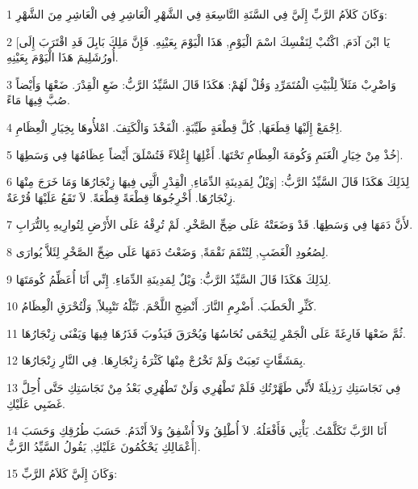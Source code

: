 \par 1 وَكَانَ كَلاَمُ الرَّبِّ إِلَيَّ فِي السَّنَةِ التَّاسِعَةِ فِي الشَّهْرِ الْعَاشِرِ فِي الْعَاشِرِ مِنَ الشَّهْرِ:
\par 2 [يَا ابْنَ آدَمَ, اكْتُبْ لِنَفْسِكَ اسْمَ الْيَوْمِ, هَذَا الْيَوْمَ بِعَيْنِهِ. فَإِنَّ مَلِكَ بَابِلَ قَدِ اقْتَرَبَ إِلَى أُورُشَلِيمَ هَذَا الْيَوْمَ بِعَيْنِهِ.
\par 3 وَاضْرِبْ مَثَلاً لِلْبَيْتِ الْمُتَمَرِّدِ وَقُلْ لَهُمْ: هَكَذَا قَالَ السَّيِّدُ الرَّبُّ: ضَعِ الْقِدْرَ. ضَعْهَا وَأَيْضاً صُبَّ فِيهَا مَاءً.
\par 4 اِجْمَعْ إِلَيْهَا قِطَعَهَا, كُلَّ قِطْعَةٍ طَيِّبَةٍ. الْفَخْذَ وَالْكَتِفَ. امْلأُوهَا بِخِيَارِ الْعِظَامِ.
\par 5 خُذْ مِنْ خِيَارِ الْغَنَمِ وَكُومَةَ الْعِظَامِ تَحْتَهَا. أَغْلِهَا إِغْلاَءً فَتُسْلَقَ أَيْضاً عِظَامُهَا فِي وَسَطِهَا].
\par 6 لِذَلِكَ هَكَذَا قَالَ السَّيِّدُ الرَّبُّ: [وَيْلٌ لِمَدِينَةِ الدِّمَاءِ, الْقِدْرِ الَّتِي فِيهَا زِنْجَارُهَا وَمَا خَرَجَ مِنْهَا زِنْجَارُهَا. أَخْرِجُوهَا قِطْعَةً قِطْعَةً. لاَ تَقَعُ عَلَيْهَا قُرْعَةٌ.
\par 7 لأَنَّ دَمَهَا فِي وَسَطِهَا. قَدْ وَضَعَتْهُ عَلَى ضِحِّ الصَّخْرِ. لَمْ تُرِقْهُ عَلَى الأَرْضِ لِتُوارِيهِ بِالتُّرَابِ.
\par 8 لِصُعُودِ الْغَضَبِ, لِتُنْقَمَ نَقْمَةً, وَضَعْتُ دَمَهَا عَلَى ضِحِّ الصَّخْرِ لِئَلاَّ يُوارَى.
\par 9 لِذَلِكَ هَكَذَا قَالَ السَّيِّدُ الرَّبُّ: وَيْلٌ لِمَدِينَةِ الدِّمَاءِ. إِنِّي أَنَا أُعَظِّمُ كُومَتَهَا.
\par 10 كَثِّرِ الْحَطَبَ. أَضْرِمِ النَّارَ. أَنْضِجِ اللَّحْمَ. تَبِّلْهُ تَتْبِيلاً, وَلْتُحْرَقِ الْعِظَامُ.
\par 11 ثُمَّ ضَعْهَا فَارِغَةً عَلَى الْجَمْرِ لِيَحْمَى نُحَاسُهَا وَيُحْرَقَ فَيَذُوبَ قَذَرُهَا فِيهَا وَيَفْنَى زِنْجَارُهَا.
\par 12 بِمَشَقَّاتٍ تَعِبَتْ وَلَمْ تَخْرُجْ مِنْهَا كَثْرَةُ زِنْجَارِهَا. فِي النَّارِ زِنْجَارُهَا.
\par 13 فِي نَجَاسَتِكِ رَذِيلَةٌ لأَنِّي طَهَّرْتُكِ فَلَمْ تَطْهُرِي وَلَنْ تَطْهُرِي بَعْدُ مِنْ نَجَاسَتِكِ حَتَّى أُحِلَّ غَضَبِي عَلَيْكِ.
\par 14 أَنَا الرَّبَّ تَكَلَّمْتُ. يَأْتِي فَأَفْعَلُهُ. لاَ أُطْلِقُ وَلاَ أُشْفِقُ وَلاَ أَنْدَمُ. حَسَبَ طُرُقِكِ وَحَسَبَ أَعْمَالِكِ يَحْكُمُونَ عَلَيْكِ, يَقُولُ السَّيِّدُ الرَّبُّ].
\par 15 وَكَانَ إِلَيَّ كَلاَمُ الرَّبِّ:
